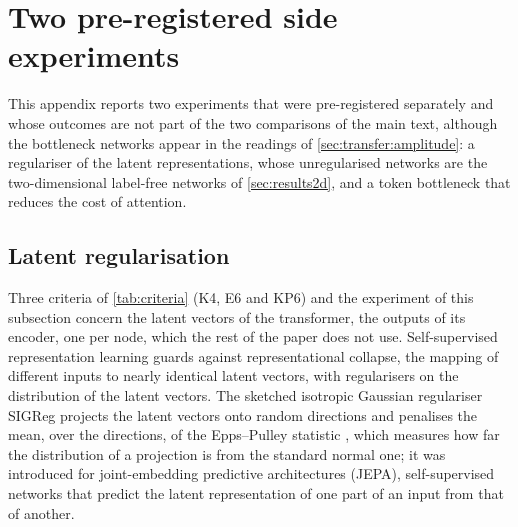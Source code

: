 \section{Two pre-registered side experiments}\label{app:e1}
\setcounter{table}{0}\setcounter{figure}{0}\setcounter{equation}{0}
\setcounter{proposition}{0}

This appendix reports two experiments that were pre-registered separately and whose outcomes
are not part of the two comparisons of the main text, although the bottleneck networks
appear in the readings of \cref{sec:transfer:amplitude}: a regulariser of the latent
representations, whose unregularised networks are the two-dimensional label-free networks
of \cref{sec:results2d}, and a token bottleneck that reduces the cost of attention.

\subsection{Latent regularisation}\label{app:e1:latent}

Three criteria of \cref{tab:criteria} (K4, E6 and KP6) and the experiment of this
subsection concern the latent vectors of the transformer, the outputs of its encoder, one
per node, which the rest of the paper does not use. Self-supervised representation learning
guards against representational collapse, the mapping of different inputs to nearly
identical latent vectors, with regularisers on the distribution of the latent vectors. The
sketched isotropic Gaussian regulariser SIGReg \cite{Balestriero2025LeJEPA} projects the
latent vectors onto random directions and penalises the mean, over the directions, of the
Epps--Pulley statistic \cite{EppsPulley1983}, which measures how far the distribution of a
projection is from the standard normal one; it was introduced for joint-embedding
predictive architectures (JEPA), self-supervised networks that predict the latent
representation of one part of an input from that of another.

